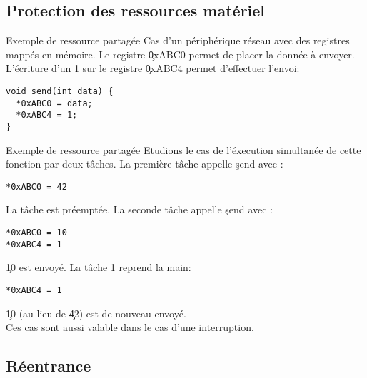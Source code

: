 \subsection{Protection des ressources matériel}

\begin{frame}[fragile]{Exemple de ressource partagée}
  Cas d'un  périphérique réseau avec des registres  mappés en mémoire.
  Le  registre  \c{0xABC0}  permet  de  placer la  donnée  à  envoyer.
  L'écriture  d'un 1  sur  le registre  \c{0xABC4} permet  d'effectuer
  l'envoi:
\begin{lstlisting} 
void send(int data) {
  *0xABC0 = data;
  *0xABC4 = 1;
}
  \end{lstlisting} 
\end{frame} 

\begin{frame}[fragile]{Exemple de ressource partagée}
  Etudions le cas de l'éxecution simultanée de cette fonction par deux
  tâches.  La première tâche appelle \c{send} avec :
  \begin{lstlisting} 
*0xABC0 = 42
  \end{lstlisting} 
  La  tâche est  préemptée.  La  seconde tâche  appelle  \c{send} avec
  :
\begin{lstlisting} 
*0xABC0 = 10
*0xABC4 = 1
\end{lstlisting} 
  \c{10} est envoyé. La tâche 1 reprend la main:
\begin{lstlisting} 
*0xABC4 = 1
\end{lstlisting} 
  \c{10} (au lieu de \c{42}) est de nouveau envoyé.\\[3mm]

  Ces cas sont aussi valable dans le cas d'une interruption.
\end{frame} 

\subsection{Réentrance}

